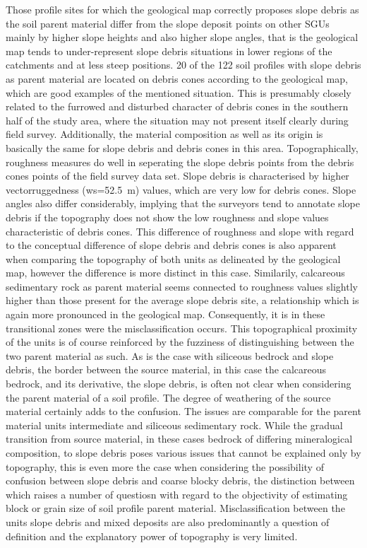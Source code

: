 \documentclass[preprint,12pt,authoryear]{elsarticle}
\begin{document}
Those profile sites for which the geological map correctly proposes slope debris as the soil parent material differ from the slope deposit points on other SGUs mainly by higher slope heights and also higher slope angles, that is the geological map tends to under-represent slope debris situations in lower regions of the catchments and at less steep positions. 20 of the 122 soil profiles with slope debris as parent material are located on debris cones according to the geological map, which are good examples of the mentioned situation. This is presumably closely related to the furrowed and disturbed character of debris cones in the southern half of the study area, where the situation may not present itself clearly during field survey. Additionally, the material composition as well as its origin is basically the same for slope debris and debris cones in this area. Topographically, roughness measures do well in seperating the slope debris points from the debris cones points of the field survey data set. Slope debris  is characterised by higher vectorruggedness (ws=52.5~m) values, which are very low for debris cones. Slope angles also differ considerably, implying that the surveyors tend to annotate slope debris if the topography does not show the low roughness and slope values characteristic of debris cones. This difference of roughness and slope with regard to the conceptual difference of slope debris and debris cones is also apparent when comparing the topography of both units as delineated by the geological map, however the difference is more distinct in this case. Similarily, calcareous sedimentary rock as parent material seems connected to roughness values slightly higher than those present for the average slope debris site, a relationship which is again more pronounced in the geological map. Consequently, it is in these transitional zones were the misclassification occurs. This topographical proximity of the units is of course  reinforced by the fuzziness of distinguishing between the two parent material as such. As is the case with siliceous bedrock and slope debris, the border between the  source material, in this case the calcareous bedrock, and its derivative, the slope debris, is often not clear when considering the parent material of a soil profile. The degree of weathering of the source material certainly adds to the confusion. The  issues are comparable for the parent material units intermediate and siliceous sedimentary rock. While the gradual transition from source material, in these cases bedrock of differing mineralogical composition, to slope debris poses various issues that cannot be explained only by topography, this is even more the case when considering the possibility of confusion between slope debris and coarse blocky debris, the distinction between which raises a number of questiosn with regard to the objectivity of  estimating block or grain size of soil profile parent material. Misclassification between the units slope debris and mixed deposits are also predominantly a question of definition and the explanatory power of topography is very limited.
\end{document}
